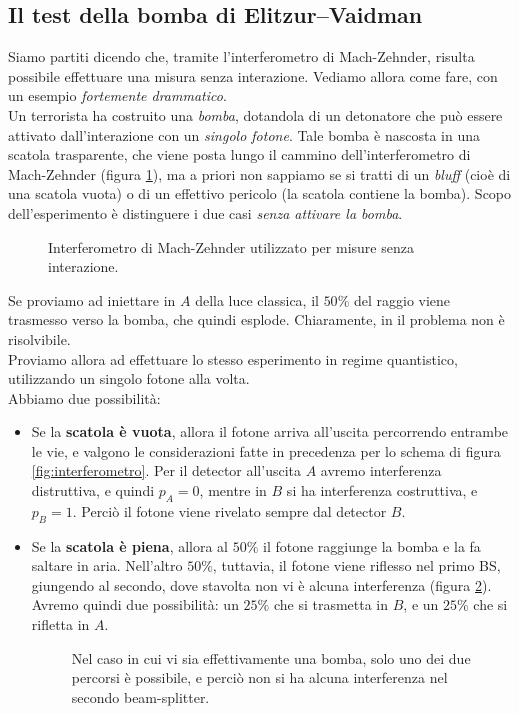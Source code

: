 \documentclass[../../InformazioneQuantistica.tex]{subfiles}
\begin{document}
\subsection{Il test della bomba di Elitzur–Vaidman}
Siamo partiti dicendo che, tramite l'interferometro di Mach-Zehnder, risulta possibile effettuare una misura senza interazione. Vediamo allora come fare, con un esempio \textit{fortemente drammatico}.\\
Un terrorista ha costruito una \textit{bomba}, dotandola di un detonatore che può essere attivato dall'interazione con un \textit{singolo fotone}. Tale bomba è nascosta in una scatola trasparente, che viene posta lungo il cammino dell'interferometro di Mach-Zehnder (figura \ref{fig:interferometro-bomba}), ma a priori non sappiamo se si tratti di un \textit{bluff} (cioè di una scatola vuota) o di un effettivo pericolo (la scatola contiene la bomba). Scopo dell'esperimento è distinguere i due casi \textit{senza attivare la bomba}.

\begin{figure}[H]
\centering

\caption{Interferometro di Mach-Zehnder utilizzato per misure senza interazione.
\label{fig:interferometro-bomba}}
\end{figure}

Se proviamo ad iniettare in $A$ della luce classica, il $50\%$ del raggio viene trasmesso verso la bomba, che quindi esplode. Chiaramente, in \MC il problema non è risolvibile.\\
Proviamo allora ad effettuare lo stesso esperimento in regime quantistico, utilizzando un singolo fotone alla volta.\\
Abbiamo due possibilità:
\begin{itemize}
\item Se la \textbf{scatola è vuota}, allora il fotone arriva all'uscita percorrendo entrambe le vie, e valgono le considerazioni fatte in precedenza per lo schema di figura \ref{fig:interferometro}. Per il detector all'uscita $A$ avremo interferenza distruttiva, e quindi $p_A=0$, mentre in $B$ si ha interferenza costruttiva, e $p_B=1$. Perciò il fotone viene rivelato sempre dal detector $B$.
\item Se la \textbf{scatola è piena}, allora al $50\%$ il fotone raggiunge la bomba e la fa saltare in aria. Nell'altro $50\%$, tuttavia, il fotone viene riflesso nel primo BS, giungendo al secondo, dove stavolta non vi è alcuna interferenza (figura \ref{fig:interferometro-boom}). Avremo quindi due possibilità: un $25\%$ che si trasmetta in $B$, e un $25\%$ che si rifletta in $A$.

\begin{figure}[H]
\centering

\caption{Nel caso in cui vi sia effettivamente una bomba, solo uno dei due percorsi è possibile, e perciò non si ha alcuna interferenza nel secondo beam-splitter.\label{fig:interferometro-boom}}
\end{figure}
\end{itemize}
\end{document}
